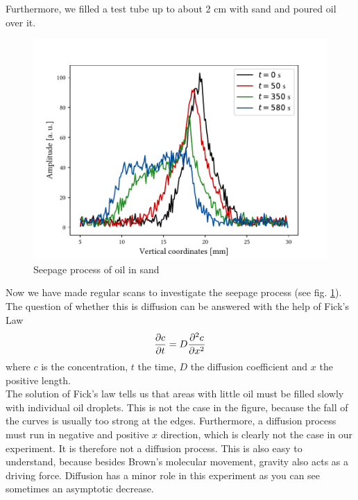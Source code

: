 Furthermore, we filled a test tube up to about 2 cm with sand and poured oil over it.
\begin{figure}[ht]
\centering
\includegraphics[scale=.6]{..//figures//f61_abb_9.pdf}
\caption{Seepage process of oil in sand}
\label{fig:sand}
\end{figure}
Now we have made regular scans to investigate the seepage process (see fig. \ref{fig:sand}).\\
The question of whether this is diffusion can be answered with the help of Fick's Law
\begin{align}
\pdv{c}{t}=D\pdv[2]{c}{x}
\end{align}
where $c$ is the concentration, $t$ the time, $D$ the diffusion coefficient and $x$ the positive length.\\
The solution of Fick's law tells us that areas with little oil must be filled slowly with individual oil droplets.
This is not the case in the figure, because the fall of the curves is usually too strong at the edges.
Furthermore, a diffusion process must run in negative and positive $x$ direction, which is clearly not the case in our experiment.
It is therefore not a diffusion process.
This is also easy to understand, because besides Brown's molecular movement, gravity also acts as a driving force.
Diffusion has a minor role in this experiment as you can see sometimes an asymptotic decrease.
